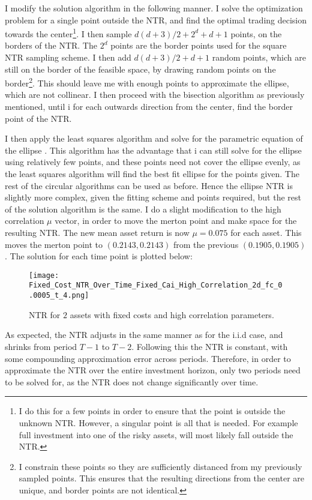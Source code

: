 \documentclass[11pt]{article}
\begin{document}
I modify the solution algorithm in the following manner.
I solve the optimization problem for a single point outside the NTR, and find the optimal trading decision towards the center\footnote{I do this for a few points in order to ensure that the point is outside the unknown NTR. However, a singular point is all that is needed. For example full investment into one of the risky assets, will most likely fall outside the NTR.}.
I then sample $d(d+3)/2+2^{d}+d+1$ points, on the borders of the NTR. The $2^{d}$ points are the border points used for the square \ac{NTR} sampling scheme.
I then add $d(d+3)/2+d+1$ random points, which are still on the border of the feasible space, by drawing random points on the border\footnote{I constrain these points so they are sufficiently distanced from my previously sampled points. This ensures that the resulting directions from the center are unique, and border points are not identical.}.
This should leave me with enough points to approximate the ellipse, which are not collinear.
I then proceed with the bisection algorithm as previously mentioned, until i for each outwards direction from the center, find the border point of the \ac{NTR}.

I then apply the least squares algorithm and solve for the parametric equation of the ellipse \autocites{gander1994least}{bertoni2010multi}. This algorithm has the advantage that i can still solve for the ellipse using relatively few points,
and these points need not cover the ellipse evenly, as the least squares algorithm will find the best fit ellipse for the points given. 
The rest of the circular algorithms can be used as before. Hence the ellipse NTR is slightly more complex, given the fitting scheme and points required,
but the rest of the solution algorithm is the same. I do a slight modification to the high correlation $\mu$ vector, in order to move the merton point and make space for the resulting NTR.
The new mean asset return is now $\mu = 0.075$ for each asset. This moves the merton point to $(0.2143 , 0.2143)$ from the previous $(0.1905, 0.1905)$.
The solution for each time point is plotted below:
\begin{figure}[!ht]
    \centering
    \texttt{[image: Fixed\_Cost\_NTR\_Over\_Time\_Fixed\_Cai\_High\_Correlation\_2d\_fc\_0.0005\_t\_4.png]}
    \caption{NTR for $2$ assets with fixed costs and high correlation parameters.}
    \label{fig: NTR_Fixed_3d_high_correlation_over_time}
\end{figure}
As expected, the NTR adjusts in the same manner as for the i.i.d case, and shrinks from period $T-1$ to $T-2$. Following this the NTR is constant, with some compounding approximation error across periods.
Therefore, in order to approximate the NTR over the entire investment horizon, only two periods need to be solved for, as the NTR does not change significantly over time.
\end{document}

